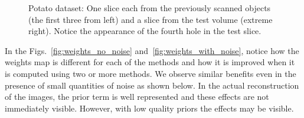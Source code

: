 \documentclass{article}
\begin{document}
\begin{figure}[!h]
\begin{subfigure}[b]{0.235\linewidth}
\captionsetup{labelformat=empty}
        \caption{}
\label{fig:potato_test}
     \end{subfigure}
      \caption{Potato dataset: One slice each from the previously scanned objects (the first three from left) and a slice from the test 
        volume (extreme right). Notice the appearance of the fourth
        hole in the test slice. }
\label{fig:object-prior_test_potato_A1}
\end{figure}
In the Figs.~\ref{fig:weights_no_noise} and~\ref{fig:weights_with_noise}, notice how the weights map is different for each of the methods and how it is improved when it is computed using two or more methods. We observe similar benefits even in the presence of small quantities of noise as shown below. In the actual reconstruction of the images, the prior term is well represented and these effects are not immediately visible.  However, with low quality priors the effects may be visible.
\end{document}
